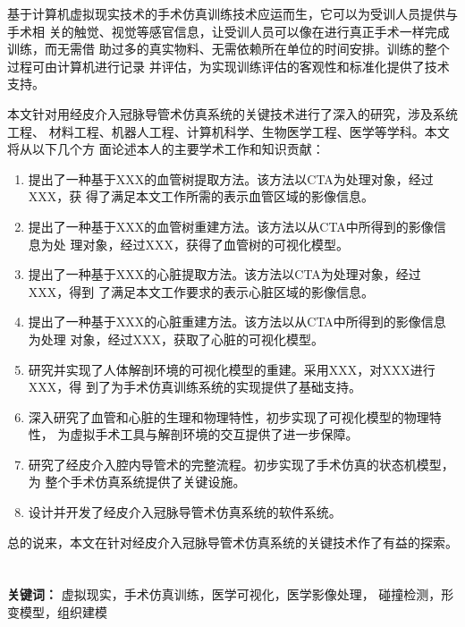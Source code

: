 基于计算机虚拟现实技术的手术仿真训练技术应运而生，它可以为受训人员提供与手术相
关的触觉、视觉等感官信息，让受训人员可以像在进行真正手术一样完成训练，而无需借
助过多的真实物料、无需依赖所在单位的时间安排。训练的整个过程可由计算机进行记录
并评估，为实现训练评估的客观性和标准化提供了技术支持。

本文针对用经皮介入冠脉导管术仿真系统的关键技术进行了深入的研究，涉及系统工程、
材料工程、机器人工程、计算机科学、生物医学工程、医学等学科。本文将从以下几个方
面论述本人的主要学术工作和知识贡献：
\begin{enumerate}
    \item 提出了一种基于XXX的血管树提取方法。该方法以CTA为处理对象，经过XXX，获
    得了满足本文工作所需的表示血管区域的影像信息。
    \item 提出了一种基于XXX的血管树重建方法。该方法以从CTA中所得到的影像信息为处
    理对象，经过XXX，获得了血管树的可视化模型。
    \item 提出了一种基于XXX的心脏提取方法。该方法以CTA为处理对象，经过XXX，得到
    了满足本文工作要求的表示心脏区域的影像信息。
    \item 提出了一种基于XXX的心脏重建方法。该方法以从CTA中所得到的影像信息为处理
    对象，经过XXX，获取了心脏的可视化模型。
    \item 研究并实现了人体解剖环境的可视化模型的重建。采用XXX，对XXX进行XXX，得
    到了为手术仿真训练系统的实现提供了基础支持。
    \item 深入研究了血管和心脏的生理和物理特性，初步实现了可视化模型的物理特性，
    为虚拟手术工具与解剖环境的交互提供了进一步保障。
    \item 研究了经皮介入腔内导管术的完整流程。初步实现了手术仿真的状态机模型，为
    整个手术仿真系统提供了关键设施。
    \item 设计并开发了经皮介入冠脉导管术仿真系统的软件系统。
\end{enumerate}
总的说来，本文在针对经皮介入冠脉导管术仿真系统的关键技术作了有益的探索。
\\
\\
\\
\noindent \textbf{关键词：} 虚拟现实，手术仿真训练，医学可视化，医学影像处理，
碰撞检测，形变模型，组织建模
